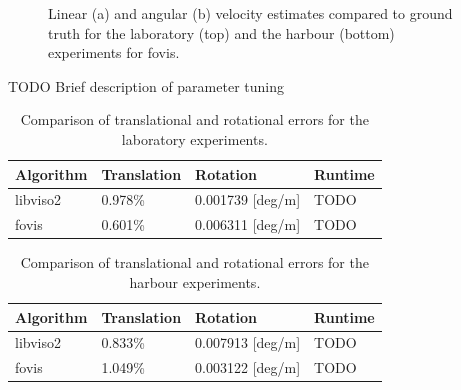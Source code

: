 \documentclass[conference]{IEEEtran}
\begin{document}
\begin{figure}
  \begin{center}
  \end{center}
  \caption{Linear (a) and angular (b) velocity estimates compared to ground truth for the laboratory (top) and the harbour (bottom) experiments for fovis.}
  \label{error-plots-fovis}
\end{figure}

TODO Brief description of parameter tuning

\begin{table}[!t]
  \renewcommand{\arraystretch}{1.3}
  \caption{Comparison of translational and rotational errors for the laboratory experiments.}
  \label{results-cirs}
  \centering
  \begin{tabular}{|l|l|l|l|} \hline
    \textbf{Algorithm} & \textbf{Translation} & \textbf{Rotation} & \textbf{Runtime}\\ \hline
    libviso2 & 0.978\% & 0.001739 [deg/m] & TODO \\ \hline
    fovis    & 0.601\% & 0.006311 [deg/m] & TODO \\ \hline
  \end{tabular} 
\end{table}

\begin{table}[!t]
  \renewcommand{\arraystretch}{1.3}
  \caption{Comparison of translational and rotational errors for the harbour experiments.}
  \label{results-roses}
  \centering
  \begin{tabular}{|l|l|l|l|} \hline
    \textbf{Algorithm} & \textbf{Translation} & \textbf{Rotation} & \textbf{Runtime}\\ \hline
    libviso2 & 0.833\% & 0.007913 [deg/m] & TODO \\ \hline
    fovis    & 1.049\% & 0.003122 [deg/m] & TODO \\ \hline
  \end{tabular} 
\end{table}
\end{document}
